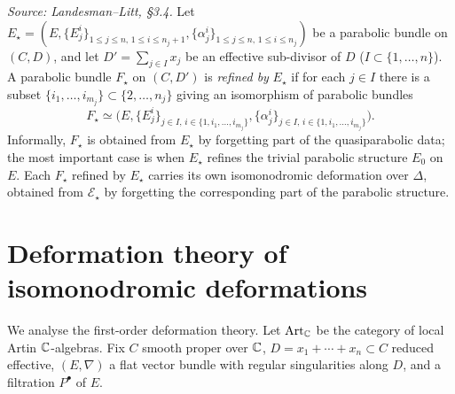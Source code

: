 \begin{definition}
  \label{def:refinements}
  \textit{Source: Landesman--Litt, \S3.4.}
  Let $E_\star = (E,\{E^i_j\}_{1\le j\le n,\,1\le i\le n_j+1},
  \{\alpha^i_j\}_{1\le j\le n,\,1\le i\le n_j})$ be a parabolic bundle on $(C,D)$,
  and let $D' = \sum_{j \in I} x_j$ be an effective sub-divisor of $D$
  ($I \subset \{1,\dots,n\}$). A parabolic bundle $F_\star$ on $(C,D')$ is
  \emph{refined by} $E_\star$ if for each $j \in I$ there is a subset
  $\{i_1,\dots,i_{m_j}\} \subset \{2,\dots,n_j\}$ giving an isomorphism of
  parabolic bundles
  \[
    F_\star \simeq \bigl(E, \{E^i_j\}_{j \in I,\, i \in \{1,i_1,\dots,i_{m_j}\}},
    \{\alpha^i_j\}_{j \in I,\, i \in \{1,i_1,\dots,i_{m_j}\}}\bigr).
  \]
  Informally, $F_\star$ is obtained from $E_\star$ by forgetting part of the
  quasiparabolic data; the most important case is when $E_\star$ refines the
  trivial parabolic structure $E_0$ on $E$. Each $F_\star$ refined by $E_\star$
  carries its own isomonodromic deformation over $\Delta$, obtained from
  $\mathscr{E}_\star$ by forgetting the corresponding part of the parabolic
  structure.
\end{definition}

\section{Deformation theory of isomonodromic deformations}
\label{sec:deformation-deformation-theory}

We analyse the first-order deformation theory. Let $\operatorname{Art}_{\mathbb{C}}$ be the category
of local Artin $\mathbb{C}$-algebras. Fix $C$ smooth proper over $\mathbb{C}$,
$D = x_1 + \cdots + x_n \subset C$ reduced effective, $(E,\nabla)$ a flat vector
bundle with regular singularities along $D$, and a filtration $P^\bullet$ of $E$.

